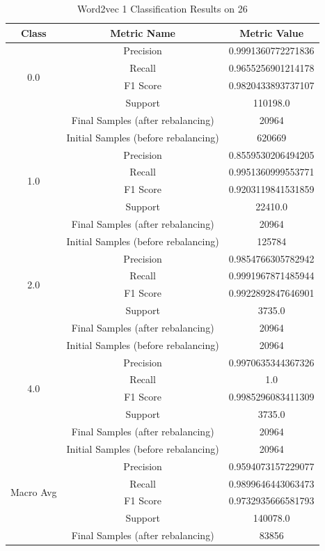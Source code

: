 \begin{longtable}{|c|c|c|}
\caption{Word2vec 1 Classification Results on 26} \label{tab:26_word2vec_1_classifiers_results} \\
\hline
Class & Metric Name & Metric Value \\
\hline
\multirow{4}{*}{0.0} & Precision & 0.9991360772271836 \\
 & Recall & 0.9655256901214178 \\
 & F1 Score & 0.9820433893737107 \\
 & Support & 110198.0 \\
 & Final Samples (after rebalancing) & 20964 \\
 & Initial Samples (before rebalancing) & 620669 \\
\hline
\multirow{4}{*}{1.0} & Precision & 0.8559530206494205 \\
 & Recall & 0.9951360999553771 \\
 & F1 Score & 0.9203119841531859 \\
 & Support & 22410.0 \\
 & Final Samples (after rebalancing) & 20964 \\
 & Initial Samples (before rebalancing) & 125784 \\
\hline
\multirow{4}{*}{2.0} & Precision & 0.9854766305782942 \\
 & Recall & 0.9991967871485944 \\
 & F1 Score & 0.9922892847646901 \\
 & Support & 3735.0 \\
 & Final Samples (after rebalancing) & 20964 \\
 & Initial Samples (before rebalancing) & 20964 \\
\hline
\multirow{4}{*}{4.0} & Precision & 0.9970635344367326 \\
 & Recall & 1.0 \\
 & F1 Score & 0.9985296083411309 \\
 & Support & 3735.0 \\
 & Final Samples (after rebalancing) & 20964 \\
 & Initial Samples (before rebalancing) & 20964 \\
\hline
\multirow{4}{*}{Macro Avg} & Precision & 0.9594073157229077 \\
 & Recall & 0.9899646443063473 \\
 & F1 Score & 0.9732935666581793 \\
 & Support & 140078.0 \\
 & Final Samples (after rebalancing) & 83856 \\

\end{longtable}
